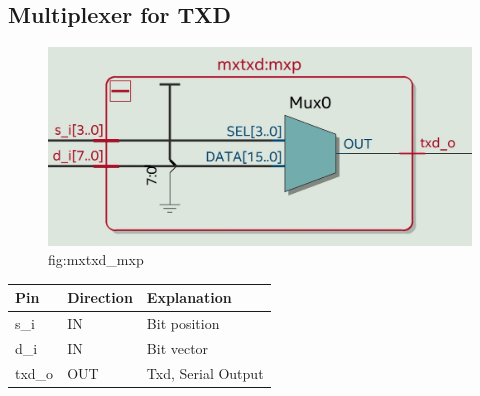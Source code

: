 \documentclass[12pt,a4 paper] {report}
\begin{document}
\subsection{Multiplexer for TXD}
\begin{figure}[h]
	\centering	
	\includegraphics[scale=0.2]{../png/mxtxd_mxp.png}
	\newline
	fig:mxtxd\_mxp\\
\end{figure}
\begin{center}
	\begin{tabular}{| p{2cm} | p{2cm} | p{4cm} |}
		\hline
		Pin & Direction  & Explanation\\
		
		\hline
		s\_i   &IN & Bit position\\
		\hline
		d\_i   & IN & Bit vector\\
		\hline
		txd\_o & OUT & Txd, Serial Output\\
		\hline	
		
	\end{tabular}
\end{center} 
\end{document}
